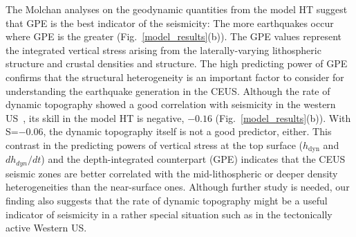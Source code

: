 \documentclass[draft,linenumbers]{agujournal2018}
\begin{document}
The Molchan analyses on the geodynamic quantities from the model HT suggest that GPE is the best indicator of the seismicity: The more earthquakes occur where GPE is the greater (Fig.~\ref{model_results}(b)). 
The GPE values represent the integrated vertical stress arising from the laterally-varying lithospheric structure and crustal densities and structure. The high predicting power of GPE confirms that the structural heterogeneity is an important factor to consider for understanding the earthquake generation in the CEUS. Although the rate of dynamic topography showed a good correlation with seismicity in the western US~\citep{becker2015western}, its skill in the model HT is negative, $-0.16$ (Fig.~\ref{model_results}(b)). With S=$-0.06$, the dynamic topography itself is not a good predictor, either. This contrast in the predicting powers of vertical stress at the top surface ($h_{\text{dyn}}$ and $dh_{dyn}/dt$) and the depth-integrated counterpart (GPE) indicates that the CEUS seismic zones are better correlated with the mid-lithospheric or deeper density heterogeneities than the near-surface ones. Although further study is needed, our finding also suggests that the rate of dynamic topography might be a useful indicator of seismicity in a rather special situation such as in the tectonically active Western US. 
\end{document}
